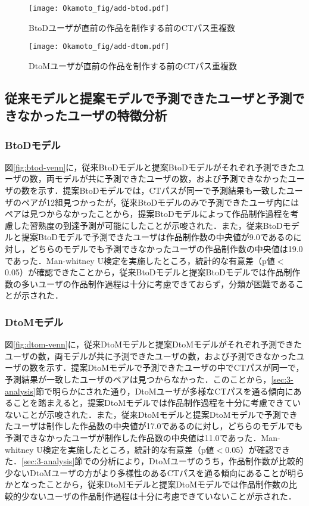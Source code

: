 \documentclass[11pt,dvipdfmx]{jreport}
\begin{document}
\begin{figure*}[t]
	\centering
	\texttt{[image: Okamoto\_fig/add-btod.pdf]}
	\caption{BtoDユーザが直前の作品を制作する前のCTパス重複数}
	\label{fig:add-btod}
\end{figure*}

\begin{figure*}[t]
	\centering
	\texttt{[image: Okamoto\_fig/add-dtom.pdf]}
	\caption{DtoMユーザが直前の作品を制作する前のCTパス重複数}
	\label{fig:add-dtom}
\end{figure*}



\subsection{従来モデルと提案モデルで予測できたユーザと予測できなかったユーザの特徴分析}

\subsubsection*{BtoDモデル}

図\ref{fig:btod-venn}に，従来BtoDモデルと提案BtoDモデルがそれぞれ予測できたユーザの数，両モデルが共に予測できたユーザの数，および予測できなかったユーザの数を示す．提案BtoDモデルでは，CTパスが同一で予測結果も一致したユーザのペアが12組見つかったが，従来BtoDモデルのみで予測できたユーザ内にはペアは見つからなかったことから，提案BtoDモデルによって作品制作過程を考慮した習熟度の到達予測が可能にしたことが示唆された．また，従来BtoDモデルと提案BtoDモデルで予測できたユーザは作品制作数の中央値が9.0であるのに対し，どちらのモデルでも予測できなかったユーザの作品制作数の中央値は19.0であった．Man-whitney U検定を実施したところ，統計的な有意差（p値$<$0.05）が確認できたことから，従来BtoDモデルと提案BtoDモデルでは作品制作数の多いユーザの作品制作過程は十分に考慮できておらず，分類が困難であることが示された．

\subsubsection*{DtoMモデル}

図\ref{fig:dtom-venn}に，従来DtoMモデルと提案DtoMモデルがそれぞれ予測できたユーザの数，両モデルが共に予測できたユーザの数，および予測できなかったユーザの数を示す．提案DtoMモデルで予測できたユーザの中でCTパスが同一で，予測結果が一致したユーザのペアは見つからなかった．このことから，\ref{sec:3-analysis}節で明らかにされた通り，DtoMユーザが多様なCTパスを通る傾向にあることを踏まえると，提案DtoMモデルでは作品制作過程を十分に考慮できていないことが示唆された．また，従来DtoMモデルと提案DtoMモデルで予測できたユーザは制作した作品数の中央値が17.0であるのに対し，どちらのモデルでも予測できなかったユーザが制作した作品数の中央値は11.0であった．Man-whitney U検定を実施したところ，統計的な有意差（p値$<$0.05）が確認できた．\ref{sec:3-analysis}節での分析により，DtoMユーザのうち，作品制作数が比較的少ないDtoMユーザの方がより多様性のあるCTパスを通る傾向にあることが明らかとなったことから，従来DtoMモデルと提案DtoMモデルでは作品制作数の比較的少ないユーザの作品制作過程は十分に考慮できていないことが示された．
\end{document}
